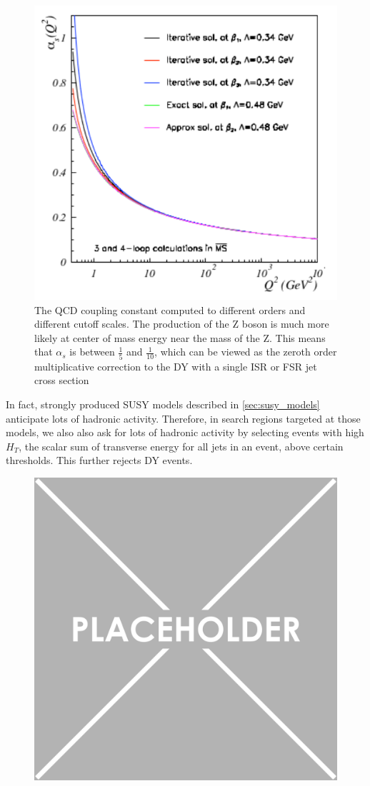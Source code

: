 \begin{figure}[h!]
  \centering
  \includegraphics[width=.5\textwidth]{figures/QCD_Coupling_Running.pdf}
  \caption{The QCD coupling constant computed to different orders and different cutoff scales. The production of the Z boson is much more likely at center of mass energy near the mass of the Z. This means that $\alpha_s$ is between $\frac{1}{5}$ and $\frac{1}{10}$, which can be viewed as the zeroth order multiplicative correction to the DY with a single ISR or FSR jet cross section} 
  \label{fig:alpha_s_running}
\end{figure}

In fact, strongly produced SUSY models described in \ref{sec:susy_models} anticipate lots of hadronic activity. Therefore, in search regions targeted at those models, we also also ask for lots of hadronic activity by selecting events with high $H_T$, the scalar sum of transverse energy for all jets in an event, above certain thresholds. This further rejects DY events.

\begin{figure}[h!]
  \centering
  \includegraphics[width=.5\textwidth]{figures/placeholder.png}
  \caption{}
  \label{fig:DY-diagram}
\end{figure}

